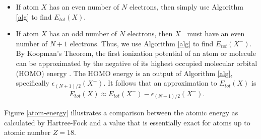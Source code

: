 \documentclass[12pt]{article}
\begin{document}
\begin{itemize}

\item If atom $X$ has an even number of $N$ electrons, then simply use Algorithm \ref{alg} to find $E_{tot}(X)$.  

\item If atom $X$ has an odd number of $N$ electrons, then $X^-$ must have an even number of $N + 1$ electrons.  Thus, we use Algorithm \ref{alg} to find $E_{tot}(X^-)$.  By Koopman's Theorem, the first ionization potential of an atom or molecule can be approximated by the negative of its highest occupied molecular orbital (HOMO) energy \cite{szabo2012}.  The HOMO energy is an output of Algorithm \ref{alg}, specifically $\epsilon_{(N+1) / 2}(X^-)$.  It follows that an approximation to $E_{tot}(X)$ is
\begin{align}
E_{tot}(X) \approx E_{tot}(X^-) - \epsilon_{(N+1) / 2}(X^-).
\end{align} 

\end{itemize}

Figure \ref{atom-energy} illustrates a comparison between the atomic energy as calculated by Hartree-Fock and a value that is essentially exact \cite{bunge1993roothaan} for atoms up to atomic number $Z = 18$.
\end{document}
